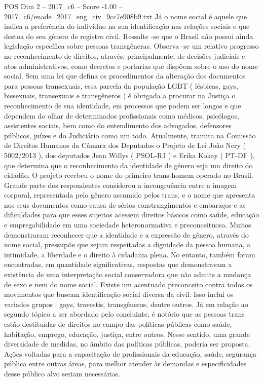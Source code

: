 \begin{textsample}{POS Dim 2 – 2017\_c6 – Score -1.00 – 2017\_c6/enade\_2017\_eng\_civ\_9cc7e908b9.txt}
Já o nome social é aquele que indica a preferência do indivíduo na sua identificação nas relações sociais e que destoa do seu gênero de registro civil.
Ressalte -se que o Brasil não possui ainda legislação específica sobre pessoas transgêneras.
Observa -se um relativo progresso no reconhecimento de direitos, através, principalmente, de decisões judiciais e atos administrativos, como decretos e portarias que dispõem sobre o uso do nome social.
Sem uma lei que defina os procedimentos da alteração dos documentos para pessoas transexuais, essa parcela da população LGBT ( lésbicas, gays, bissexuais, transexuais e transgêneros ) é obrigada a procurar na Justiça o reconhecimento de sua identidade, em processos que podem ser longos e que dependem do olhar de determinados profissionais como médicos, psicólogos, assistentes sociais, bem como do entendimento dos advogados, defensores públicos, juízes e do Judiciário como um todo.
Atualmente, tramita na Comissão de Direitos Humanos da Câmara dos Deputados o Projeto de Lei João Nery ( 5002/2013 ), dos deputados Jean Willys ( PSOL-RJ ) e Erika Kokay ( PT-DF ), que determina que o reconhecimento da identidade de gênero seja um direito do cidadão.
O projeto recebeu o nome do primeiro trans-homem operado no Brasil.
Grande parte dos respondentes considerou a incongruência entre a imagem corporal, representada pelo gênero assumido pelos trans, e o nome que apresenta nos seus documentos como causa de sérios constrangimentos e embaraços e as dificuldades para que esses sujeitos acessem direitos básicos como saúde, educação e empregabilidade em uma sociedade heteronormativa e preconceituosa.
Muitos demonstraram reconhecer que a identidade e a expressão de gênero, através do nome social, pressupõe que sejam respeitadas a dignidade da pessoa humana, a intimidade, a liberdade e o direito à cidadania plena.
No entanto, também foram encontradas, em quantidade significativas, respostas que demonstravam a existência de uma interpretação social conservadora que não admite a mudança de sexo e nem do nome social.
Existe um acentuado preconceito contra todos os movimentos que buscam identificação social diversa da civil.
Isso inclui os variados grupos : gays, travestis, transgêneros, dentre outros.
Já em relação ao segundo tópico a ser abordado pelo concluinte, é notório que as pessoas trans estão destituídas de direitos no campo das políticas públicas como saúde, habitação, emprego, educação, justiça, entre outros.
Nesse sentido, uma grande diversidade de medidas, no âmbito das políticas públicas, poderia ser proposta.
Ações voltadas para a capacitação de profissionais da educação, saúde, segurança pública entre outras áreas, para melhor atender às demandas e especificidades desse público alvo seriam necessárias.

\end{textsample}
